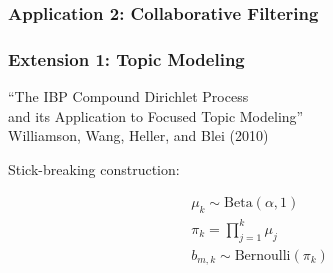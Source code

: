 \documentclass[13pt]{beamer}
\begin{document}
\begin{frame}
\frametitle{Application 2: Collaborative Filtering}

\end{frame}
\begin{frame}
\frametitle{Extension 1: Topic Modeling}

\begin{center}
``The IBP Compound Dirichlet Process \\
and its Application to Focused Topic Modeling'' \\
Williamson, Wang, Heller, and Blei (2010)
\end{center}

Stick-breaking construction:

\begin{eqnarray*}
\mu_k \sim \text{Beta}(\alpha, 1) \\
\pi_k = \prod_{j=1}^k \mu_j \\
b_{m,k} \sim \text{Bernoulli}(\pi_k) 
\end{eqnarray*}


\end{frame}
\end{document}
